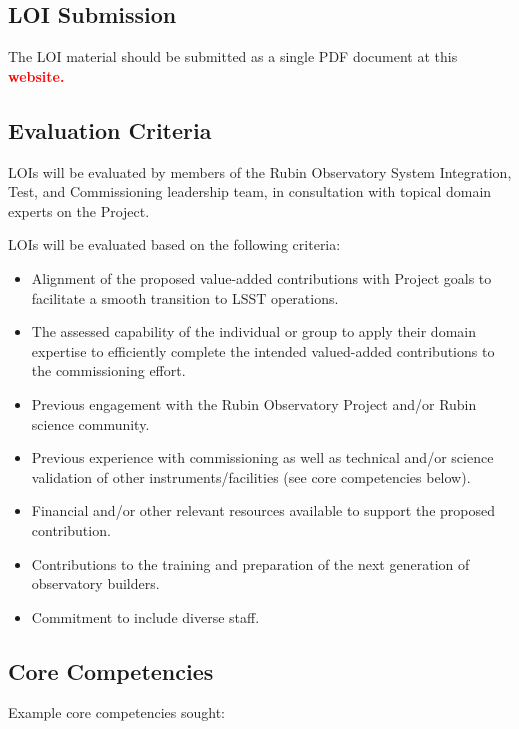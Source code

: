 \documentclass[SE,authoryear,toc,lsstdraft]{lsstdoc}
\newcommand{\FIXME}[1]{{\bf \textcolor{red}{#1}}}
\begin{document}
\subsection{LOI Submission}

The LOI material should be submitted as a single PDF document at this \FIXME{website.}

\subsection{Evaluation Criteria}

LOIs will be evaluated by members of the Rubin Observatory System Integration, Test, and Commissioning leadership team, in consultation with topical domain experts on the Project.

LOIs will be evaluated based on the following criteria:
\begin{itemize}
\item Alignment of the proposed value-added contributions with Project goals to facilitate a smooth transition to LSST operations.
\item The assessed capability of the individual or group to apply their domain expertise to efficiently complete the intended valued-added contributions to the commissioning effort.
\item Previous engagement with the Rubin Observatory Project and/or Rubin science community.
\item Previous experience with commissioning as well as technical and/or science validation of other instruments/facilities (see core competencies below).
\item Financial and/or other relevant resources available to support the proposed contribution.
\item Contributions to the training and preparation of the next generation of observatory builders.
\item Commitment to include diverse staff.
\end{itemize}

\subsection{Core Competencies}

Example core competencies sought:
\end{document}
